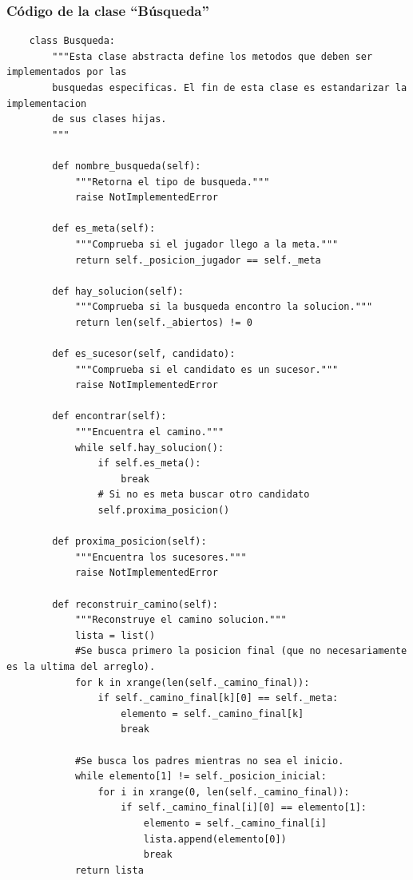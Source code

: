 \documentclass[letter, titlepage, 10pt]{article}
\begin{document}
\subsubsection{Código de la clase ``Búsqueda''}
\begin{lstlisting}
    class Busqueda:
        """Esta clase abstracta define los metodos que deben ser implementados por las 
        busquedas especificas. El fin de esta clase es estandarizar la implementacion
        de sus clases hijas.
        """
        
        def nombre_busqueda(self):
            """Retorna el tipo de busqueda."""
            raise NotImplementedError
        
        def es_meta(self):
            """Comprueba si el jugador llego a la meta."""
            return self._posicion_jugador == self._meta
    
        def hay_solucion(self):
            """Comprueba si la busqueda encontro la solucion."""
            return len(self._abiertos) != 0
    
        def es_sucesor(self, candidato):
            """Comprueba si el candidato es un sucesor."""
            raise NotImplementedError
        
        def encontrar(self):
            """Encuentra el camino."""
            while self.hay_solucion():
                if self.es_meta():
                    break
                # Si no es meta buscar otro candidato
                self.proxima_posicion()
        
        def proxima_posicion(self):
            """Encuentra los sucesores."""
            raise NotImplementedError
    
        def reconstruir_camino(self):
            """Reconstruye el camino solucion."""
            lista = list()
            #Se busca primero la posicion final (que no necesariamente es la ultima del arreglo).
            for k in xrange(len(self._camino_final)):
                if self._camino_final[k][0] == self._meta:
                    elemento = self._camino_final[k]
                    break
    
            #Se busca los padres mientras no sea el inicio.
            while elemento[1] != self._posicion_inicial:
                for i in xrange(0, len(self._camino_final)):
                    if self._camino_final[i][0] == elemento[1]:
                        elemento = self._camino_final[i]
                        lista.append(elemento[0])
                        break
            return lista
    

\end{lstlisting}
\end{document}
